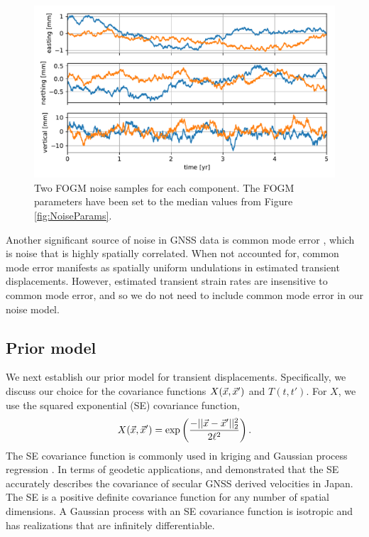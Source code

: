 \documentclass[extra,mreferee]{gji}
\begin{document}
\begin{figure}
\includegraphics{figures/noise/noise-samples.pdf}
\caption{
Two FOGM noise samples for each component. The FOGM parameters
have been set to the median values from Figure \ref{fig:NoiseParams}.
}   
\label{fig:NoiseSamples}
\end{figure}


Another significant source of noise in GNSS data is common mode error
\citep[e.g.,][]{Wdowinski1997,Dong2006}, which is noise that is highly
spatially correlated. When not accounted for, common mode error
manifests as spatially uniform undulations in estimated transient
displacements. However, estimated transient strain rates are
insensitive to common mode error, and so we do not need to include
common mode error in our noise model.

\subsection{Prior model}\label{sec:SignalModel}

We next establish our prior model for transient displacements.
Specifically, we discuss our choice for the covariance functions
$X(\vec{x},\vec{x}')$ and $T(t,t')$. For $X$, we use the squared exponential
(SE) covariance function,
\begin{equation}\label{eq:SE}
X(\vec{x},\vec{x}') = \exp\left(\frac{-||\vec{x} - \vec{x}'||_2^2}{2 \ell^2}\right).
\end{equation}
The SE covariance function is commonly used in kriging
\citep[e.g,][]{Cressie1992} and Gaussian process regression
\citep[e.g.,][]{Rasmussen2006}. In terms of geodetic applications,
\citet{Kato1998} and \cite{El-Fiky1999} demonstrated that the SE
accurately describes the covariance of secular GNSS derived velocities
in Japan. The SE is a positive definite covariance function for any
number of spatial dimensions. A Gaussian process with an SE covariance
function is isotropic and has realizations that are infinitely
differentiable.
\end{document}
